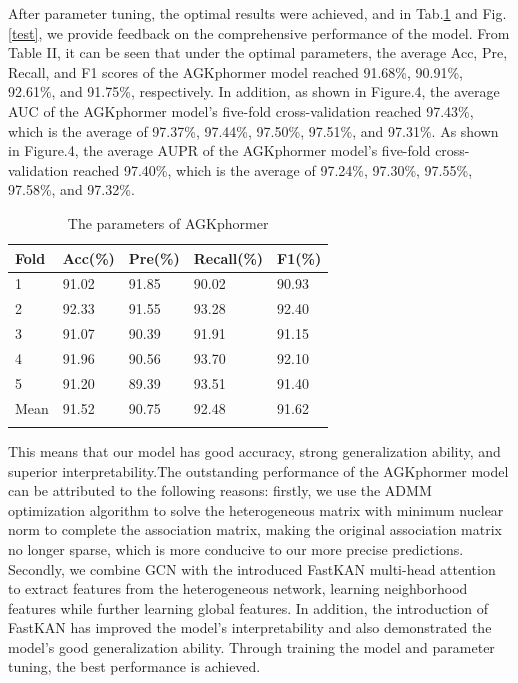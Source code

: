 \documentclass[a4paper,fleqn]{cas-dc}
\begin{document}
After parameter tuning, the optimal results were achieved, and in Tab.\ref{table2} and Fig.\ref{test}, we provide feedback on the comprehensive performance of the model. From Table II, it can be seen that under the optimal parameters, the average Acc, Pre, Recall, and F1 scores of the AGKphormer model reached 91.68\%, 90.91\%, 92.61\%, and 91.75\%, respectively. In addition, as shown in Figure.4, the average AUC of the AGKphormer model's five-fold cross-validation reached 97.43\%, which is the average of 97.37\%, 97.44\%, 97.50\%, 97.51\%, and 97.31\%. As shown in Figure.4, the average AUPR of the AGKphormer model's five-fold cross-validation reached 97.40\%, which is the average of 97.24\%, 97.30\%, 97.55\%, 97.58\%, and 97.32\%.
\begin{table}[htbp]
	\centering
	\vspace{-1mm} %
	\caption{The parameters of AGKphormer}
	\begin{tabular}{lllll}
		\toprule
		Fold & Acc(\%) & Pre(\%) & Recall(\%) &F1(\%) \\
		\midrule
		1 & 91.02 & 91.85 & 90.02 & 90.93 \\
		2 & 92.33 & 91.55 & 93.28 & 92.40 \\ %
		3 & 91.07 & 90.39 & 91.91 & 91.15 \\ %
		4 & 91.96 & 90.56 & 93.70 & 92.10 \\ %
		5 & 91.20 & 89.39 & 93.51 & 91.40 \\ %
		Mean & 91.52 & 90.75 & 92.48 & 91.62 \\
		
		\bottomrule
		\vspace{-7mm} %
		\label{table2}
	\end{tabular}
\end{table}

This means that our model has good accuracy, strong generalization ability, and superior interpretability.The outstanding performance of the AGKphormer model can be attributed to the following reasons: firstly, we use the ADMM optimization algorithm to solve the heterogeneous matrix with minimum nuclear norm to complete the association matrix, making the original association matrix no longer sparse, which is more conducive to our more precise predictions. Secondly, we combine GCN with the introduced FastKAN multi-head attention to extract features from the heterogeneous network, learning neighborhood features while further learning global features. In addition, the introduction of FastKAN has improved the model's interpretability and also demonstrated the model's good generalization ability. Through training the model and parameter tuning, the best performance is achieved.
\end{document}

